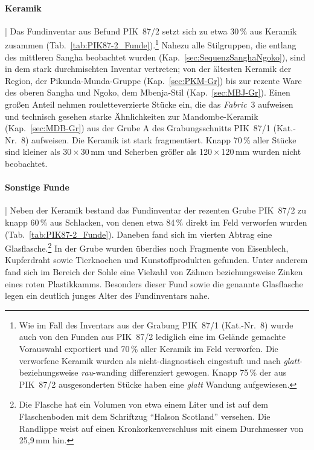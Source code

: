 \paragraph{Keramik}\hspace{-.5em}|\hspace{.5em}%
Das Fundinventar aus Befund PIK~87/2 setzt sich zu etwa 30\,\% aus Keramik zusammen (Tab.~\ref{tab:PIK87-2_Funde}).\footnote{Wie im Fall des Inventars aus der Grabung PIK~87/1 (Kat.-Nr.~8) wurde auch von den Funden aus PIK~87/2 lediglich eine im Gelände gemachte Vorauswahl exportiert und 70\,\% aller Keramik im Feld verworfen. Die verworfene Keramik wurden als nicht-diagnostisch eingestuft und nach \textit{glatt}- beziehungsweise \textit{rau}-wanding differenziert gewogen. Knapp 75\,\% der aus PIK~87/2 ausgesonderten Stücke haben eine \textit{glatt} Wandung aufgewiesen.} Nahezu alle Stilgruppen, die entlang des mittleren \mbox{Sangha} beobachtet wurden (Kap.~\ref{sec:SequenzSanghaNgoko}), sind in dem stark durchmischten Inventar vertreten; von der ältesten Keramik der Region, der Pikunda-Munda-Gruppe (Kap.~\ref{sec:PKM-Gr}) bis zur rezente Ware des oberen \mbox{Sangha} und \mbox{Ngoko}, dem Mbenja-Stil (Kap.~\ref{sec:MBJ-Gr}). Einen großen Anteil nehmen rouletteverzierte Stücke ein, die das \textit{Fabric}~3 aufweisen und technisch gesehen starke Ähnlichkeiten zur Mandombe-Keramik (Kap.~\ref{sec:MDB-Gr}) aus der Grube A des Grabungsschnitts PIK~87/1 (Kat.-Nr.~8) aufweisen. Die Keramik ist stark fragmentiert. Knapp 70\,\% aller Stücke sind kleiner als 30\,$\times$\,30\,mm und Scherben größer als 120\,$\times$\,120\,mm wurden nicht beobachtet.

\paragraph{Sonstige Funde}\hspace{-.5em}|\hspace{.5em}%
Neben der Keramik bestand das Fundinventar der rezenten Grube PIK~87/2 zu knapp 60\,\% aus Schlacken, von denen etwa 84\,\% direkt im Feld verworfen wurden (Tab.~\ref{tab:PIK87-2_Funde}). Daneben fand sich im vierten Abtrag eine Glasflasche.\footnote{Die Flasche hat ein Volumen von etwa einem Liter und ist auf dem Flaschenboden mit dem Schriftzug \enquote{Halson Scotland} versehen. Die Randlippe weist auf einen Kronkorkenverschluss mit einem Durchmesser von 25,9\,mm hin.} In der Grube wurden überdies noch Fragmente von Eisenblech, Kupferdraht sowie Tierknochen und Kunstoffprodukten gefunden. Unter anderem fand sich im Bereich der Sohle eine Vielzahl von Zähnen beziehungsweise Zinken eines roten Plastikkamms. Besonders dieser Fund sowie die genannte Glasflasche legen ein deutlich junges Alter des Fundinventars nahe.

